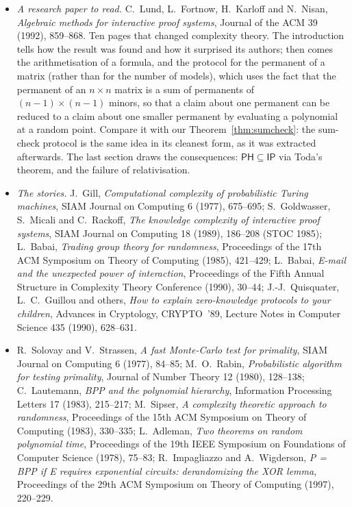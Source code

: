 \begin{itemize}
\item \emph{A research paper to read.} C.~Lund, L.~Fortnow, H.~Karloff and N.~Nisan, \emph{Algebraic methods for interactive proof systems}, Journal of the ACM 39 (1992), 859--868. Ten pages that changed complexity theory. The introduction tells how the result was found and how it surprised its authors; then comes the arithmetisation of a formula, and the protocol for the permanent of a matrix (rather than for the number of models), which uses the fact that the permanent of an $n\times n$ matrix is a sum of permanents of $(n-1)\times(n-1)$ minors, so that a claim about one permanent can be reduced to a claim about one smaller permanent by evaluating a polynomial at a random point. Compare it with our Theorem~\ref{thm:sumcheck}: the sum-check protocol is the same idea in its cleanest form, as it was extracted afterwards. The last section draws the consequences: $\mathsf{PH}\subseteq\mathsf{IP}$ via Toda's theorem, and the failure of relativisation.
\item \emph{The stories.} J.~Gill, \emph{Computational complexity of probabilistic Turing machines}, SIAM Journal on Computing 6 (1977), 675--695; S.~Goldwasser, S.~Micali and C.~Rackoff, \emph{The knowledge complexity of interactive proof systems}, SIAM Journal on Computing 18 (1989), 186--208 (STOC 1985); L.~Babai, \emph{Trading group theory for randomness}, Proceedings of the 17th ACM Symposium on Theory of Computing (1985), 421--429; L.~Babai, \emph{E-mail and the unexpected power of interaction}, Proceedings of the Fifth Annual Structure in Complexity Theory Conference (1990), 30--44; J.-J.~Quisquater, L.~C.~Guillou and others, \emph{How to explain zero-knowledge protocols to your children}, Advances in Cryptology, CRYPTO~'89, Lecture Notes in Computer Science 435 (1990), 628--631.
\item R.~Solovay and V.~Strassen, \emph{A fast Monte-Carlo test for primality}, SIAM Journal on Computing 6 (1977), 84--85; M.~O.~Rabin, \emph{Probabilistic algorithm for testing primality}, Journal of Number Theory 12 (1980), 128--138; C.~Lautemann, \emph{BPP and the polynomial hierarchy}, Information Processing Letters 17 (1983), 215--217; M.~Sipser, \emph{A complexity theoretic approach to randomness}, Proceedings of the 15th ACM Symposium on Theory of Computing (1983), 330--335; L.~Adleman, \emph{Two theorems on random polynomial time}, Proceedings of the 19th IEEE Symposium on Foundations of Computer Science (1978), 75--83; R.~Impagliazzo and A.~Wigderson, \emph{P = BPP if E requires exponential circuits: derandomizing the XOR lemma}, Proceedings of the 29th ACM Symposium on Theory of Computing (1997), 220--229.

\end{itemize}
